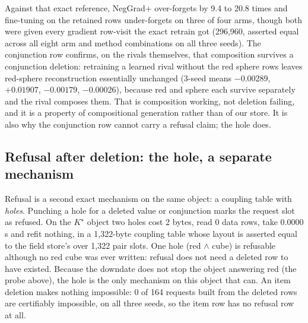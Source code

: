 \documentclass{article} %
\newcommand{\Kstar}{\ensuremath{K^{\star}}}
\begin{document}
\noindent Against that exact reference, NegGrad+ over-forgets by 9.4 to 20.8 times and
fine-tuning on the retained rows under-forgets on three of four arms, though both were given
every gradient row-visit the exact retrain got (296,960, asserted equal across all eight arm
and method combinations on all three seeds). %
The conjunction row confirms, on the rivals themselves, that composition survives a
conjunction deletion: retraining a learned rival without the red sphere rows leaves red-sphere
reconstruction essentially unchanged (3-seed means $-0.00289$, $+0.01907$, $-0.00179$,
$-0.00026$), because red and sphere each survive separately and the rival composes them.
That is composition working, not deletion failing, and it is a property of compositional
generation rather than of our store. It is also why the conjunction row cannot carry a
refusal claim; the hole does.

\subsection{Refusal after deletion: the hole, a separate mechanism}
\label{sec:hole}

Refusal is a second exact mechanism on the same object: a coupling table with \emph{holes}.
Punching a hole for a deleted value or conjunction marks the request slot as refused. On the
$\Kstar$ object two holes cost 2 bytes, read 0 data rows, take 0.0000 s and refit nothing, in
a 1,322-byte coupling table whose layout is asserted equal to the field store's over 1,322 pair
slots. %
One hole (red $\wedge$ cube) is refusable although no red cube was ever written: refusal does
not need a deleted row to have existed. %
Because the downdate does not stop the object answering red (the probe above), the hole is the
only mechanism on this object that can. An item deletion makes nothing impossible: 0 of 164
requests built from the deleted rows are certifiably impossible, on all three seeds, so the
item row has no refusal row at all. %
\end{document}
